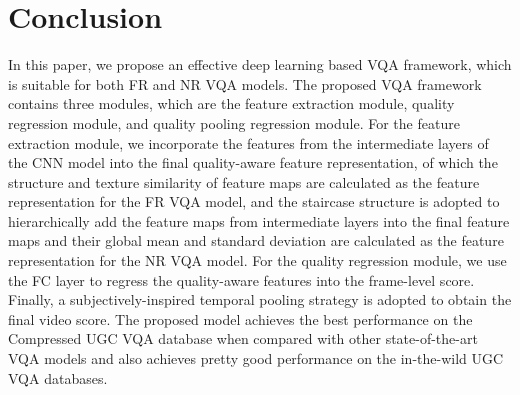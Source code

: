 \documentclass{article}
\begin{document}
\section{Conclusion}
\vspace{-0.2cm}
In this paper, we propose an effective deep learning based VQA framework, which is suitable for both FR and NR VQA models. The proposed VQA framework contains three modules, which are the feature extraction module, quality regression module, and quality pooling regression module. For the feature extraction module, we incorporate the features from the intermediate layers of the CNN model into the final quality-aware feature representation, of which the structure and texture similarity of feature maps are calculated as the feature representation for the FR VQA model, and the staircase structure is adopted to hierarchically add the feature maps from intermediate layers into the final feature maps and their global mean and standard deviation are calculated as the feature representation for the NR VQA model. For the quality regression module, we use the FC layer to regress the quality-aware features into the frame-level score. Finally, a subjectively-inspired temporal pooling strategy is adopted to obtain the final video score. The proposed model achieves the best performance on the Compressed UGC VQA database when compared with other state-of-the-art VQA models and also achieves pretty good performance on the in-the-wild UGC VQA databases.




\vspace{-0.3cm}

\small


\end{document}
